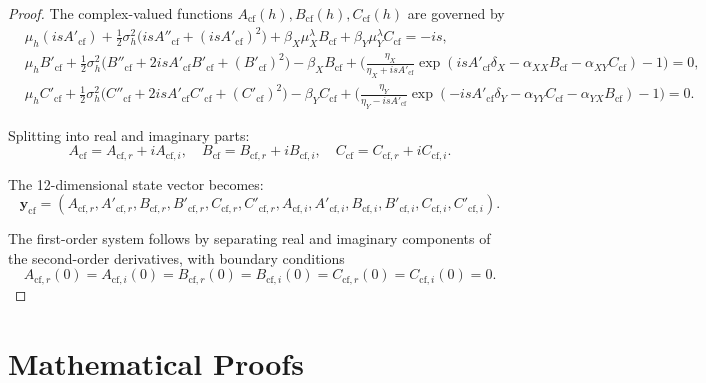 \documentclass{article}
\theoremstyle{definition}
\begin{document}
\begin{proof}
The complex-valued functions $A_{\text{cf}}(h), B_{\text{cf}}(h), C_{\text{cf}}(h)$ are governed by
\[
\begin{aligned}
& \mu_h (i s A'_{\text{cf}}) 
+ \tfrac{1}{2}\sigma_h^2 \big( i s A''_{\text{cf}} + (i s A'_{\text{cf}})^2 \big)
+ \beta_X \mu_X^\lambda B_{\text{cf}} 
+ \beta_Y \mu_Y^\lambda C_{\text{cf}} 
= - i s, \\[0.8ex]
& \mu_h B'_{\text{cf}} 
+ \tfrac{1}{2}\sigma_h^2 \big( B''_{\text{cf}} + 2 i s A'_{\text{cf}} B'_{\text{cf}} + (B'_{\text{cf}})^2 \big)
- \beta_X B_{\text{cf}} 
+ \Big( \tfrac{\eta_X}{\eta_X + i s A'_{\text{cf}}} 
\exp\!\left( i s A'_{\text{cf}} \delta_X - \alpha_{XX} B_{\text{cf}} - \alpha_{XY} C_{\text{cf}} \right) - 1 \Big) 
= 0, \\[0.8ex]
& \mu_h C'_{\text{cf}} 
+ \tfrac{1}{2}\sigma_h^2 \big( C''_{\text{cf}} + 2 i s A'_{\text{cf}} C'_{\text{cf}} + (C'_{\text{cf}})^2 \big)
- \beta_Y C_{\text{cf}} 
+ \Big( \tfrac{\eta_Y}{\eta_Y - i s A'_{\text{cf}}} 
\exp\!\left( -i s A'_{\text{cf}} \delta_Y - \alpha_{YY} C_{\text{cf}} - \alpha_{YX} B_{\text{cf}} \right) - 1 \Big) 
= 0.
\end{aligned}
\]

Splitting into real and imaginary parts:
\[
A_{\text{cf}} = A_{\text{cf},r} + i A_{\text{cf},i}, \quad 
B_{\text{cf}} = B_{\text{cf},r} + i B_{\text{cf},i}, \quad 
C_{\text{cf}} = C_{\text{cf},r} + i C_{\text{cf},i}.
\]

The 12-dimensional state vector becomes:
\[
\mathbf{y}_{\text{cf}} = (A_{\text{cf},r}, A'_{\text{cf},r}, B_{\text{cf},r}, B'_{\text{cf},r}, C_{\text{cf},r}, C'_{\text{cf},r}, A_{\text{cf},i}, A'_{\text{cf},i}, B_{\text{cf},i}, B'_{\text{cf},i}, C_{\text{cf},i}, C'_{\text{cf},i}).
\]

The first-order system follows by separating real and imaginary components of the second-order derivatives, with boundary conditions
\[
A_{\text{cf},r}(0)=A_{\text{cf},i}(0)=B_{\text{cf},r}(0)=B_{\text{cf},i}(0)=C_{\text{cf},r}(0)=C_{\text{cf},i}(0)=0.
\]
\end{proof}

\section{Mathematical Proofs}
\label{sec:proofs}
\end{document}
